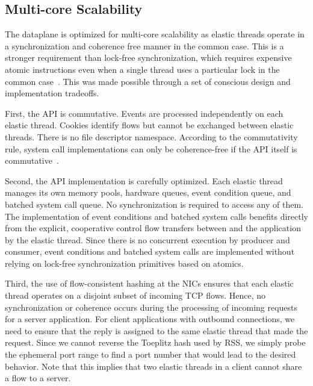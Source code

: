 \subsection{Multi-core Scalability}
\label{sec:impl:cohfree}

The \ix dataplane is optimized for multi-core scalability as elastic
threads operate in a synchronization and coherence free manner in the
common case. This is a stronger requirement than lock-free
synchronization, which requires expensive atomic instructions even
when a single thread uses a particular lock in the common
case~\cite{DBLP:conf/sosp/DavidGT13}.  This was made possible 
through a set of conscious design and implementation tradeoffs. 

First, the \ix API is commutative. Events are processed independently
on each elastic thread. Cookies identify flows but cannot be exchanged
between elastic threads. There is no file descriptor namespace.
According to the commutativity rule, system call implementations can
only be coherence-free if the API itself is
commutative~\cite{DBLP:conf/sosp/ClementsKZMK13}.

Second, the API implementation is carefully optimized.  Each elastic
thread manages its own memory pools, hardware queues, event condition
queue, and batched system call queue. No synchronization is required
to access any of them. The implementation of event conditions and
batched system calls benefits directly from the explicit, cooperative
control flow transfers between \ix and the application by the elastic
thread.  Since there is no concurrent execution by producer and
consumer, event conditions and batched system calls are implemented
without relying on lock-free synchronization primitives based
on atomics.

Third, the use of flow-consistent hashing at the NICs ensures that
each elastic thread operates on a disjoint subset of incoming TCP
flows. Hence, no synchronization or coherence occurs during the
processing of incoming requests for a server application. For client
applications with outbound connections, we need to ensure that the
reply is assigned to the same elastic thread that made the
request. Since we cannot reverse the Toeplitz hash used by RSS, we
simply probe the ephemeral port range to find a port number that
would lead to the desired behavior. Note that this implies that two
elastic threads in a client cannot share a flow to a server. %
 
